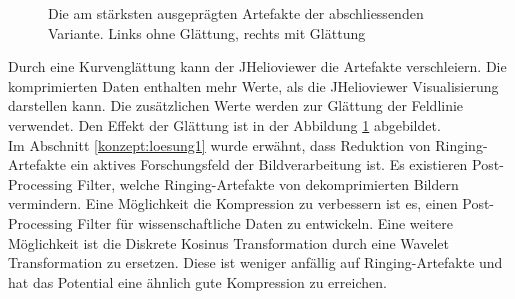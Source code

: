 \begin{figure}[!htbp]
	\center
	\caption{Die am stärksten ausgeprägten Artefakte der abschliessenden Variante. Links ohne Glättung, rechts mit Glättung}
	\label{resultate:loesung1:dct:final:artefakte}
\end{figure}
Durch eine Kurvenglättung kann der JHelioviewer die Artefakte verschleiern. Die komprimierten Daten enthalten mehr Werte, als die JHelioviewer Visualisierung darstellen kann. Die zusätzlichen Werte werden zur Glättung der Feldlinie verwendet. Den Effekt der Glättung ist in der Abbildung \ref{resultate:loesung1:dct:final:artefakte} abgebildet.\\
Im Abschnitt \ref{konzept:loesung1} wurde erwähnt, dass Reduktion von Ringing-Artefakte ein aktives Forschungsfeld der Bildverarbeitung ist. Es existieren Post-Processing Filter, welche Ringing-Artefakte von dekomprimierten Bildern vermindern. Eine Möglichkeit die Kompression zu verbessern ist es, einen Post-Processing Filter für wissenschaftliche Daten zu entwickeln. Eine weitere Möglichkeit ist die Diskrete Kosinus Transformation durch eine Wavelet Transformation zu ersetzen. Diese ist weniger anfällig auf Ringing-Artefakte und hat das Potential eine ähnlich gute Kompression zu erreichen.

